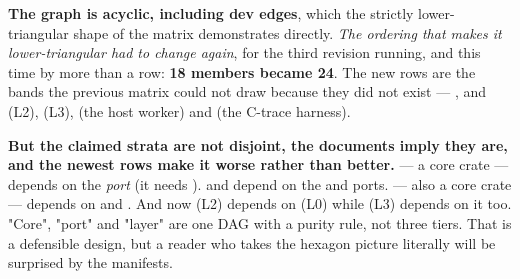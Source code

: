 \documentclass[10.5pt]{article}
\begin{document}
\textbf{The graph is acyclic, including dev edges}, which the strictly lower-triangular shape of
the matrix demonstrates directly. \emph{The ordering that makes it lower-triangular had to change
again}, for the third revision running, and this time by more than a row: \textbf{18 members
became 24}. The new rows are the bands the previous matrix could not draw because they did not
exist — ,  and  (L2),  (L3),
 (the host worker) and  (the C-trace harness).

\textbf{But the claimed strata are not disjoint, the documents imply they are, and the newest
rows make it worse rather than better.}  — a core crate — depends on the
 \emph{port} (it needs ).  and
 depend on the  and  ports.  — also a
core crate — depends on  and . And now  (L2) depends
on  (L0) while  (L3) depends on it too. "Core", "port" and
"layer" are one DAG with a purity rule, not three tiers. That is a defensible design, but a
reader who takes the hexagon picture literally will be surprised by the manifests.
\end{document}
